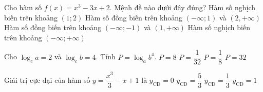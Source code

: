\begin{ex}%
	Cho hàm số $f(x)=x^3-3x+2$. Mệnh đề nào dưới đây đúng?
	\choice
	{Hàm số nghịch biến trên khoảng $(1;2)$}
	{Hàm số đồng biến trên khoảng $(-\infty;1)$ và $(2,+\infty)$}
	{\True Hàm số đồng biến trên khoảng $(-\infty;-1)$ và $(1,+\infty)$}
	{Hàm số nghịch biến trên khoảng $(-\infty;+\infty)$}
\end{ex}
\begin{ex}%
	Cho $\log_c a=2$ và $\log_c b=4$. Tính $P=\log_a b^4$.
	\choice
	{\True $P=8$}
	{$P=\dfrac{1}{32}$}
	{$P=\dfrac{1}{8}$}
	{$P=32$}
\end{ex}
\begin{ex}%
	Giái trị cực đại của hàm số $y=\dfrac{x^3}{3}-x+1$ là 
	\choice
	{$y_{\text{CĐ}}=0$}
	{\True $y_{\text{CĐ}}=\dfrac{5}{3}$}
	{$y_{\text{CĐ}}=\dfrac{1}{3}$}
	{$y_{\text{CĐ}}=1$}
\end{ex}
